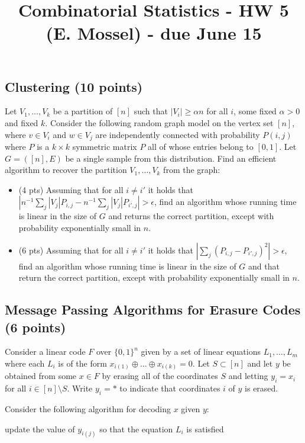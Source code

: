 \documentclass[11pt]{article} \usepackage{amssymb}
\newcommand{\eps}{\epsilon} \newcommand{\lam}{\lambda}
\begin{document}
\title{Combinatorial Statistics - HW 5 (E. Mossel) - due June 15}
\maketitle

\subsection{Clustering (10 points)}
Let $V_1,\ldots,V_k$ be a partition of $[n]$ such that 
$|V_i| \geq \alpha n$ for all $i$, some fixed $\alpha > 0$ and fixed $k$. 
Consider the following random graph model on the vertex set $[n]$, where $v \in V_i$ and $w \in V_j$ are independently connected with probability 
$P(i,j)$ where $P$ is a $k \times k$ symmetric matrix $P$ all of whose entries belong to $[0,1]$. 
Let $G=([n],E)$ be a single sample from this distribution. Find an efficient algorithm  
to recover the partition $V_1,\ldots,V_k$ from the graph:
\begin{itemize}
\item (4 pts)
Assuming that for all $i \neq i'$ it holds that $\left| n^{-1} \sum_{j} |V_j| P_{i,j} - n^{-1} \sum_{j} |V_j| P_{i',j} \right| > \eps$, find an algorithm whose running time is linear in the size of $G$ and returns the correct partition, except with probability exponentially small in $n$.
\item (6 pts)
Assuming that for all $i \neq i'$ it holds that $|\sum_{j} (P_{i,j} - P_{i',j})^2| > \eps$, find an algorithm whose running time is linear in the size of $G$ and that return the correct partition, except with probability exponentially small in $n$.
\end{itemize}

\subsection{Message Passing Algorithms for Erasure Codes (6 points)}
Consider a linear code $F$ over $\{0,1\}^n$ given by a set of linear
equations $L_1,\ldots,L_m$ where each $L_i$ is of the form $x_{i(1)}
\oplus \ldots \oplus x_{i(k)} = 0$.  Let $S \subset [n]$ and let $y$
be obtained from some $x \in F$ by erasing all of the coordinates $S$
and letting $y_i = x_i$ for all $i \in [n] \setminus S$. Write $y_i =
*$ to indicate that coordinates $i$ of $y$ is erased.

Consider the following algorithm for decoding $x$ given $y$:
\begin{algorithmic}[htb]
   \STATE update the value of $y_{i(j)}$ so
  that the equation $L_i$ is satisfied
  \ENDWHILE
\end{algorithmic}
\end{document}
